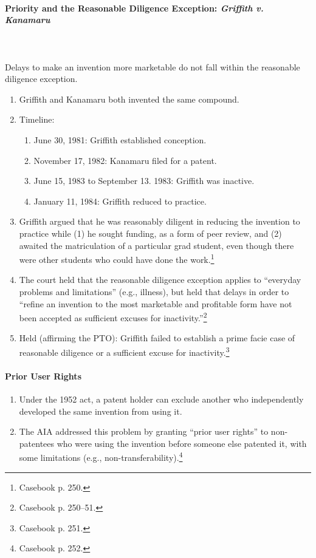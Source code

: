 \paragraph{Priority and the Reasonable Diligence Exception: \emph{Griffith v. 
Kanamaru}}
~\\\\
Delays to make an invention more marketable do not fall within the reasonable 
diligence exception.

\begin{enumerate}
    \item Griffith and Kanamaru both invented the same compound.
    \item Timeline:
    \begin{enumerate}
        \item June 30, 1981: Griffith established conception.
        \item November 17, 1982: Kanamaru filed for a patent.
        \item June 15, 1983 to September 13. 1983: Griffith was inactive.
        \item January 11, 1984: Griffith reduced to practice.
    \end{enumerate}
    \item Griffith argued that he was reasonably diligent in reducing the 
    invention to practice while (1) he sought funding, as a form of peer review, 
    and (2) awaited the matriculation of a particular grad student, even though 
    there were other students who could have done the work.\footnote{Casebook p. 
    250.}
    \item The court held that the reasonable diligence exception applies to 
    ``everyday problems and limitations'' (e.g., illness), but held that delays 
    in order to ``refine an invention to the most marketable and profitable form 
    have not been accepted as sufficient excuses for 
    inactivity.''\footnote{Casebook p. 250--51.}
    \item Held (affirming the PTO): Griffith failed to establish a prime facie 
    case of reasonable diligence or a sufficient excuse for 
    inactivity.\footnote{Casebook p. 251.}
\end{enumerate}

\paragraph{Prior User Rights}

\begin{enumerate}
    \item Under the 1952 act, a patent holder can exclude another who 
    independently developed the same invention from using it.
    \item The AIA addressed this problem by granting ``prior user rights'' to 
    non-patentees who were using the invention before someone else patented it, 
    with some limitations (e.g., non-transferability).\footnote{Casebook p. 252.}
\end{enumerate}

